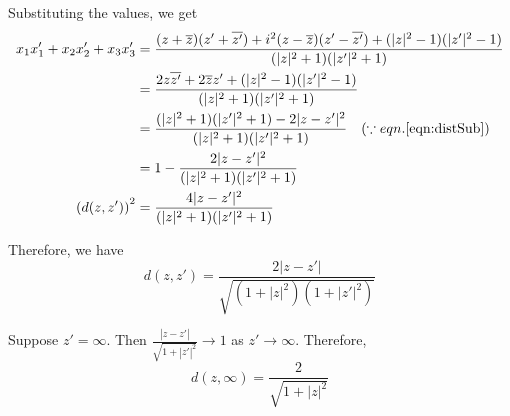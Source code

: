 \noindent Substituting the values, we get
\begin{align*}
	x_1x'_1+x_2x'_2+x_3x'_3
	& = \frac{(z+\overline{z})(z'+\overline{z'}) + i^2(z-\overline{z})(z'-\overline{z'}) + (|z|^2-1)(|{z'}|^2-1) }{ (|z|^2+1)(|{z'}|^2+1) } \\
	& = \frac{2z\overline{z'}+2\overline{z}z'+(|z|^2-1)(|{z'}|^2-1)}{ (|z|^2+1)(|{z'}|^2+1) } \\
	& = \frac{(|z|^2+1)(|{z'}|^2+1)-2|{z-z'}|^2}{ (|z|^2+1)(|{z'}|^2+1) } \quad (\because eqn.\ref{eqn:distSub}) \\
	& = 1-\frac{2|{z-z'}|^2}{ (|z|^2+1)(|{z'}|^2+1) } \\
	\left( d(z,z') \right)^2
	& = \frac{4|{z-z'}|^2}{ (|z|^2+1)(|{z'}|^2+1) } 
\end{align*}

\noindent Therefore, we have
\begin{equation}
	d(z,z')= \frac{2|z-z'|}{\sqrt{(1+|z|^2)(1+|z'|^2)}}
	\label{eqn:distRiemann}
\end{equation}

Suppose $z' = \infty$.
Then $\frac{|z-z'|}{\sqrt{1+|z'|^2}} \to 1$ as $z' \to \infty$.
Therefore,
\begin{equation}
	d(z,\infty)= \frac{2}{\sqrt{1+|z|^2}}
	\label{eqn:distRiemannInfinity}
\end{equation}

